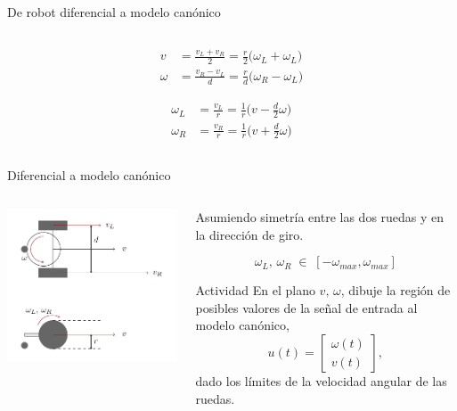 \documentclass[presentation,aspectratio=169]{beamer}
\begin{document}
\begin{frame}[label={sec:org9a790ed}]{De robot diferencial a modelo canónico}
\begin{columns}
\begin{column}{0.6\columnwidth}
\begin{align*}
  v &= \frac{v_L + v_R}{2} = \frac{r}{2} \big(\omega_L + \omega_L\big)\\
  \omega &= \frac{v_R - v_L}{d} = \frac{r}{d} \big(\omega_R - \omega_L\big)
\end{align*}

\begin{align*}
  \omega_L &= \frac{v_L}{r} = \frac{1}{r} \big(v - \frac{d}{2} \omega\big)\\
  \omega_R &= \frac{v_R}{r} = \frac{1}{r} \big(v + \frac{d}{2} \omega\big)
 \end{align*}
\end{column}
\end{columns}
\end{frame}

\begin{frame}[label={sec:org76e4d08}]{Diferencial a modelo canónico}
\begin{columns}
\begin{column}{0.4\columnwidth}
\begin{center}
 \includegraphics[width=.8\linewidth]{../figures/unicycle-model-details}
\end{center}
\end{column}

\begin{column}{0.6\columnwidth}
Asumiendo simetría entre las dos ruedas y en la dirección de giro.

\[ \omega_L,\, \omega_R \; \in \; [-\omega_{max}, \omega_{max}]\]

\pause

\alert{Actividad}
En el plano \(v,\, \omega\),  dibuje la región de posibles valores de la señal de entrada al modelo canónico,
\[ u(t) = \begin{bmatrix} \omega(t)\\v(t) \end{bmatrix}, \]
dado los límites de la velocidad angular de las ruedas.
\end{column}
\end{columns}
\end{frame}
\end{document}
